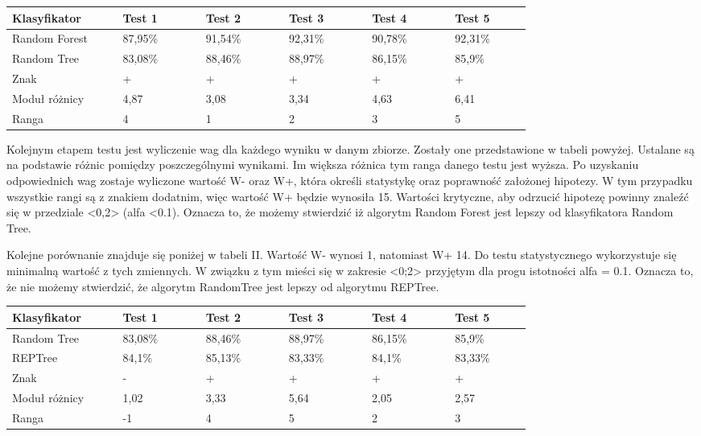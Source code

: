 \documentclass[conference]{IEEEtran}
\begin{document}
\begin{table}[H]

	\begin{tabular}{|p{0.16\linewidth}|p{0.12\linewidth}|p{0.12\linewidth}|p{0.12\linewidth}|p{0.12\linewidth}|p{0.11\linewidth}|}%
	\hline\centering
	Klasyfikator 	& Test 1 & Test 2 & Test 3 & Test 4 & Test 5 \\ \hline\centering
	Random Forest	& 87,95\% & 91,54\% & 92,31\% & 90,78\% & 92,31\% \\ \hline\centering
	Random Tree	& 83,08\% & 88,46\% & 88,97\% & 86,15\% & 85,9\% \\ \hline\centering
	Znak	& + & + & + & + & + \\ \hline\centering
	Moduł różnicy	& 4,87 & 3,08 & 3,34 & 4,63 & 6,41 \\ \hline\centering
	Ranga	& 4 & 1 & 2 & 3 & 5 \\ \hline
	\end{tabular}
\end{table}
Kolejnym etapem testu jest wyliczenie wag dla każdego wyniku w danym zbiorze. Zostały one przedstawione w tabeli powyżej. Ustalane są na podstawie różnic pomiędzy poszczególnymi wynikami. Im większa różnica tym ranga danego testu jest wyższa. Po uzyskaniu odpowiednich wag zostaje wyliczone wartość W- oraz W+, która określi statystykę oraz poprawność założonej hipotezy. W tym przypadku wszystkie rangi są z znakiem dodatnim, więc wartość W+ będzie wynosiła 15. Wartości krytyczne, aby odrzucić hipotezę powinny znaleźć się w przedziale <0,2> (alfa <0.1). Oznacza to, że możemy stwierdzić iż algorytm Random Forest jest lepszy od klasyfikatora Random Tree. 

Kolejne porównanie znajduje się poniżej w tabeli II. Wartość W- wynosi 1, natomiast W+ 14. Do testu statystycznego wykorzystuje się minimalną wartość z tych zmiennych. W związku z tym mieści się w zakresie <0;2> przyjętym dla progu istotności alfa = 0.1. Oznacza to, że nie możemy stwierdzić, że algorytm RandomTree jest lepszy od algorytmu REPTree.  

\begin{table}[H]

	\begin{tabular}{|p{0.16\linewidth}|p{0.12\linewidth}|p{0.12\linewidth}|p{0.12\linewidth}|p{0.12\linewidth}|p{0.11\linewidth}|}%
	\hline\centering
	Klasyfikator 	& Test 1 & Test 2 & Test 3 & Test 4 & Test 5 \\ \hline\centering
	Random Tree	& 83,08\% & 88,46\% & 88,97\% & 86,15\% & 85,9\% \\ \hline\centering
	REPTree	& 84,1\% & 85,13\% & 83,33\% & 84,1\% & 83,33\% \\ \hline\centering
	Znak	& - & + & + & + & + \\ \hline\centering
	Moduł różnicy  & 1,02 & 3,33 & 5,64 & 2,05 & 2,57  \\ \hline\centering
	Ranga	& -1 & 4 & 5 & 2 & 3 \\ \hline
	\end{tabular}
\end{table} 
\end{document}

